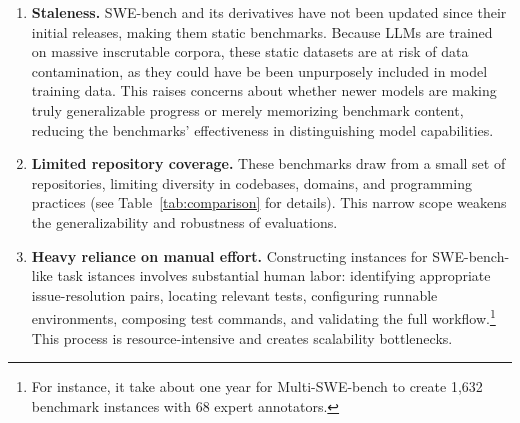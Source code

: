 \begin{table}[ht]
    \centering
     \vspace{-1em}
    \caption{Comparison with existing issue resolving benchmarks.}
    \vspace{-1em}
    \label{tab:comparison}
\end{table}

\begin{enumerate}[leftmargin=*]
    \item \textbf{Staleness.} SWE-bench and its derivatives have not been updated since their initial releases, making them static benchmarks. 
	Because LLMs are trained on massive inscrutable corpora, these static datasets are at risk of data contamination, as they could have be been unpurposely included in model training data. 
	This raises concerns about whether newer models are making truly generalizable progress or merely memorizing benchmark content, reducing the benchmarks' effectiveness in distinguishing model capabilities. 

	\item \textbf{Limited repository coverage.} These benchmarks draw from a small set of repositories, limiting diversity in codebases, domains, and programming practices (see Table~\ref{tab:comparison} for details). This narrow scope weakens the generalizability and robustness of evaluations.

	\item \textbf{Heavy reliance on manual effort.} Constructing instances for SWE-bench-like task istances involves substantial human labor: identifying appropriate issue-resolution pairs, locating relevant tests, configuring runnable environments, composing test commands, and validating the full workflow.\footnote{For instance, it take about one year for Multi-SWE-bench \cite{zan2025multi} to create 1,632 benchmark instances with 68 expert annotators. } This process is resource-intensive and creates scalability bottlenecks.
\end{enumerate}


